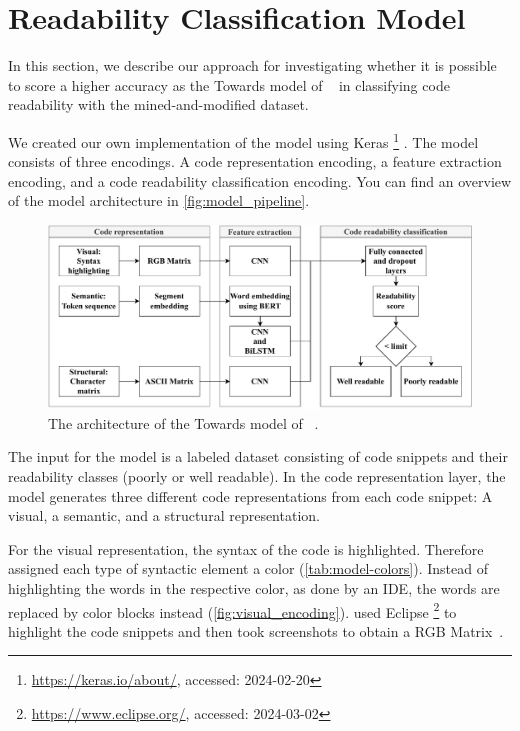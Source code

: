 \documentclass[%
class=scrreprt,
chapterprefix=false,%
open=right,%
twoside=true,%
paper=a4,%
logofile={Logo\_zentral\_farbig\_EN.png},%
thesistype=master,%
UKenglish,%
]{se2thesis}
\newcounter{urlfootnote}
\newcommand{\onecurl}[2]{%
	\stepcounter{urlfootnote}%
	\expandafter\def\csname urlfootnote:#1\endcsname{\theurlfootnote}%
	\footnote{\label{url:#1}\url{#1}, accessed: #2}%
}
\newcommand{\curl}[2]{%
		\onecurl{#1}{#2}%
}
\theoremstyle{definition}
\begin{document}
\section{Readability Classification Model} \label{Readability Classification Model}

	In this section, we describe our approach for investigating whether it is possible to score a higher accuracy as the Towards model of \citeauthor{mi2022towards}~\cite{mi2022towards} in classifying code readability with the mined-and-modified dataset.
	
	We created our own implementation of the model using Keras\curl{https://keras.io/about/}{2024-02-20}. The model consists of three encodings. A code representation encoding, a feature extraction encoding, and a code readability classification encoding. You can find an overview of the model architecture in \autoref{fig:model_pipeline}.
	
	\begin{figure}[tb]
		\centering
		\includegraphics[width=\textwidth]{img/model_pipline.pdf}
		\caption{The architecture of the Towards model of \citeauthor{mi2022towards}~\cite{mi2022towards}.}
		\label{fig:model_pipeline}
	\end{figure}
	
	The input for the model is a labeled dataset consisting of code snippets and their readability classes (poorly or well readable). In the code representation layer, the model generates three different code representations from each code snippet: A visual, a semantic, and a structural representation. 
	
	For the visual representation, the syntax of the code is highlighted. Therefore \citeauthor{mi2022towards} assigned each type of syntactic element a color (\autoref{tab:model-colors}). Instead of highlighting the words in the respective color, as done by an IDE, the words are replaced by color blocks instead (\autoref{fig:visual_encoding}). \citeauthor{mi2022towards} used Eclipse\curl{https://www.eclipse.org/}{2024-03-02} to highlight the code snippets and then took screenshots to obtain a RGB Matrix~\cite{mi2022towards}.
		
\end{document}

